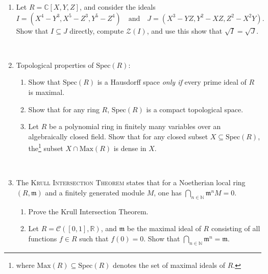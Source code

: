 \documentclass[12pt]{amsart}
\newcommand{\N}{\mathbb{N}}
\newcommand{\R}{\mathbb{R}}
\newcommand{\C}{\mathbb{C}}
\newcommand{\m}{\mathfrak{m}}
\newcommand{\cZ}{\mathcal{Z}}
\newcommand{\Spec}{\mathrm{Spec}}
\newcommand{\Max}{\mathrm{Max}}
\begin{document}
\begin{enumerate}

\item Let $R=\C[X,Y,Z]$, and consider the ideals
\[  I = (X^4-Y^3,X^5-Z^3,Y^5-Z^4) \quad \text{and} \quad J = ( X^3 - YZ, Y^2-XZ, Z^2-X^2Y).\]
Show that $I \subseteq J$ directly, compute $\cZ(I)$, and use this show that $\sqrt{I}=\sqrt{J}$.

\


\item Topological properties of $\Spec(R)$:
\begin{enumerate}
\item Show that $\Spec(R)$ is a Hausdorff space \emph{only if} every prime ideal of $R$ is maximal.
\item Show that for any ring $R$, $\Spec(R)$ is a compact topological space.
\item Let $R$ be a polynomial ring in finitely many variables over an algebraically closed field. Show that for any closed subset $X\subseteq \Spec(R)$, the\footnote{where $\Max(R)\subseteq \Spec(R)$ denotes the set of maximal ideals of $R$.} subset $X\cap \Max(R)$ is dense in $X$.
\end{enumerate}

\

\item The \textsc{Krull Intersection Theorem} states that for a Noetherian local ring $(R,\m)$ and a finitely generated module $M$, one has $\bigcap_{n\in\N} \m^{n} M = 0$.
\begin{enumerate}
\item Prove the Krull Intersection Theorem.
\item Let $R=\mathcal{C}([0,1],\R)$, and $\m$ be the maximal ideal of $R$ consisting of all functions $f\in R$ such that $f(0)=0$. Show that $\bigcap_{n\in \N} \m^n = \m$.
\end{enumerate}






\end{enumerate}
\end{document}
